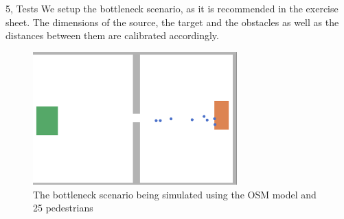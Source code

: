 \documentclass[10pt,a4paper]{article}
\begin{document}
\begin{task}{5, Tests}
We setup the bottleneck scenario, as it is recommended in the exercise sheet. The dimensions of the source, the target and the obstacles as well as the distances between them are calibrated accordingly.
\begin{figure}[H]
    \centering
    \includegraphics[width=0.7\textwidth]{pictures/task5/bottleneck.png}
    \caption{The bottleneck scenario being simulated using the OSM model and 25 pedestrians}
    \label{fig:bottleneck_task5}
\end{figure}
\end{task}
\end{document}
